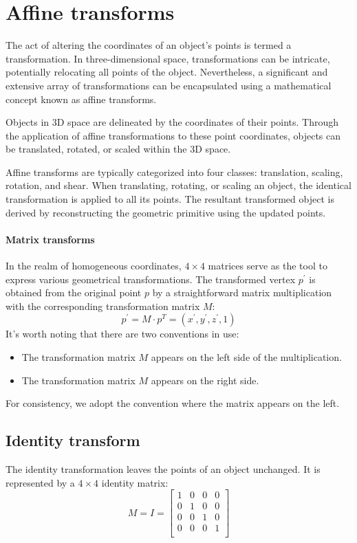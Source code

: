 \section{Affine transforms}

The act of altering the coordinates of an object's points is termed a transformation. 
In three-dimensional space, transformations can be intricate, potentially relocating all points of the object.
Nevertheless, a significant and extensive array of transformations can be encapsulated using a mathematical concept known as affine transforms.

Objects in 3D space are delineated by the coordinates of their points. 
Through the application of affine transformations to these point coordinates, objects can be translated, rotated, or scaled within the 3D space.

Affine transforms are typically categorized into four classes: translation, scaling, rotation, and shear. 
When translating, rotating, or scaling an object, the identical transformation is applied to all its points. 
The resultant transformed object is derived by reconstructing the geometric primitive using the updated points.

\paragraph*{Matrix transforms}
In the realm of homogeneous coordinates, $4 \times 4$ matrices serve as the tool to express various geometrical transformations. 
The transformed vertex $p^\prime$ is obtained from the original point $p$ by a straightforward matrix multiplication with the corresponding transformation matrix $M$:
\[p^\prime = M \cdot p^T = \left( x^\prime, y^\prime, z^\prime, 1 \right)\]
It's worth noting that there are two conventions in use:
\begin{itemize}
    \item The transformation matrix $M$ appears on the left side of the multiplication.
    \item The transformation matrix $M$ appears on the right side.
\end{itemize}
For consistency, we adopt the convention where the matrix appears on the left.

\subsection{Identity transform}
The identity transformation leaves the points of an object unchanged. 
It is represented by a $4 \times 4$ identity matrix:
\[M=I=\begin{bmatrix}
    1 & 0 & 0 & 0 \\
    0 & 1 & 0 & 0 \\
    0 & 0 & 1 & 0 \\
    0 & 0 & 0 & 1 \\
\end{bmatrix}\]

